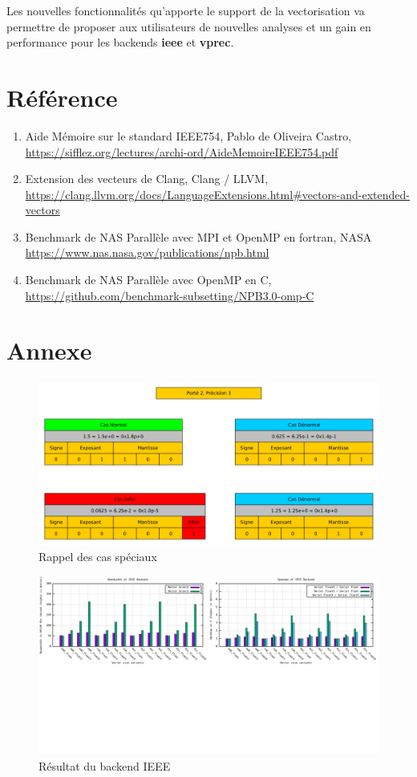 \documentclass[11pt, letterpaper]{article}
\begin{document}
Les nouvelles fonctionnalités qu'apporte le support de la vectorisation va
permettre de proposer aux utilisateurs de nouvelles analyses et un gain en
performance pour les backends \textbf{ieee} et \textbf{vprec}.

\section{Référence}
\label{sec:org1c5b291}

\begin{enumerate}
\item \label{org6f58747} Aide Mémoire sur le standard IEEE754, Pablo de Oliveira Castro,
\url{https://sifflez.org/lectures/archi-ord/AideMemoireIEEE754.pdf}
\item \label{orgb824849} Extension des vecteurs de Clang, Clang / LLVM,
\url{https://clang.llvm.org/docs/LanguageExtensions.html\#vectors-and-extended-vectors}
\item Benchmark de NAS Parallèle avec MPI et OpenMP en fortran, NASA
\url{https://www.nas.nasa.gov/publications/npb.html}
\item Benchmark de NAS Parallèle avec OpenMP en C,
\url{https://github.com/benchmark-subsetting/NPB3.0-omp-C}
\end{enumerate}

\section{Annexe}
\label{sec:org741ada1}

\label{orgf991456}
\begin{figure}[htbp]
\centering
\includegraphics[width=450px]{../ressources/special_case.png}
\caption{\label{fig:org7e5d64a}Rappel des cas spéciaux}
\end{figure}

\label{org2d4bfc0}
\begin{figure}[htbp]
\centering
\includegraphics[width=450px]{../ressources/vm_ieee.png}
\caption{\label{fig:org84116da}Résultat du backend IEEE}
\end{figure}
\end{document}
